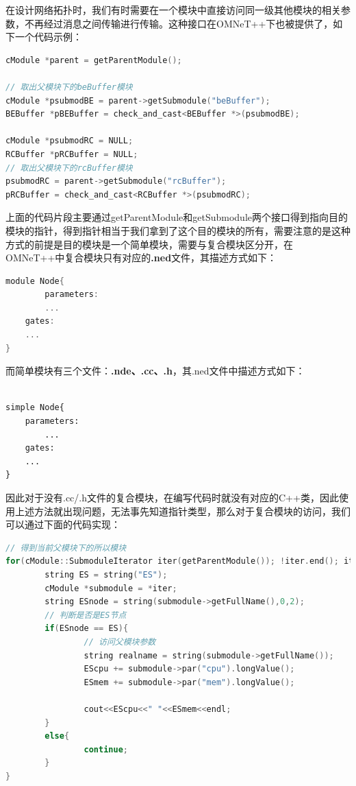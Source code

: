 在设计网络拓扑时，我们有时需要在一个模块中直接访问同一级其他模块的相关参数，不再经过消息之间传输进行传输。这种接口在OMNeT++下也被提供了，如下一个代码示例：

\begin{lstlisting}[language=c]
cModule *parent = getParentModule();

// 取出父模块下的beBuffer模块
cModule *psubmodBE = parent->getSubmodule("beBuffer");
BEBuffer *pBEBuffer = check_and_cast<BEBuffer *>(psubmodBE);

cModule *psubmodRC = NULL;
RCBuffer *pRCBuffer = NULL;
// 取出父模块下的rcBuffer模块
psubmodRC = parent->getSubmodule("rcBuffer");
pRCBuffer = check_and_cast<RCBuffer *>(psubmodRC);

\end{lstlisting}

上面的代码片段主要通过getParentModule和getSubmodule两个接口得到指向目的模块的指针，得到指针相当于我们拿到了这个目的模块的所有，需要注意的是这种方式的前提是目的模块是一个简单模块，需要与复合模块区分开，在OMNeT++中复合模块只有对应的\textbf{.ned}文件，其描述方式如下：

\begin{lstlisting}[language=c]
module Node{
        parameters:
    	...
	gates:
	...
}
\end{lstlisting}

而简单模块有三个文件：\textbf{.nde、.cc、.h}，其.ned文件中描述方式如下：

\begin{verbatim}

simple Node{
	parameters:
    	...
	gates:
	...
}
\end{verbatim}

因此对于没有.cc\slash .h文件的复合模块，在编写代码时就没有对应的C++类，因此使用上述方法就出现问题，无法事先知道指针类型，那么对于复合模块的访问，我们可以通过下面的代码实现：

\begin{lstlisting}[language=c]
// 得到当前父模块下的所以模块
for(cModule::SubmoduleIterator iter(getParentModule()); !iter.end(); iter++){
        string ES = string("ES");
        cModule *submodule = *iter;
        string ESnode = string(submodule->getFullName(),0,2);
        // 判断是否是ES节点
        if(ESnode == ES){
                // 访问父模块参数
                string realname = string(submodule->getFullName());
                EScpu += submodule->par("cpu").longValue();
                ESmem += submodule->par("mem").longValue();

                cout<<EScpu<<" "<<ESmem<<endl;
        }
        else{
                continue;
        }
}
\end{lstlisting}

